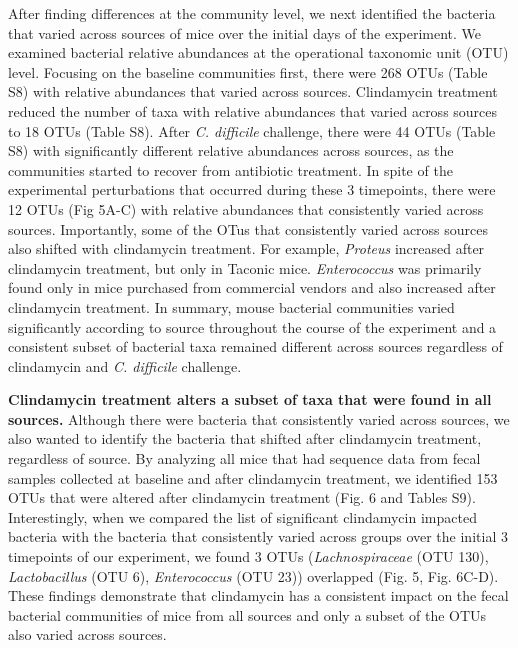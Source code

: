 \documentclass[11pt,]{article}
\begin{document}
After finding differences at the community level, we next identified the
bacteria that varied across sources of mice over the initial days of the
experiment. We examined bacterial relative abundances at the operational
taxonomic unit (OTU) level. Focusing on the baseline communities first,
there were 268 OTUs (Table S8) with relative abundances that varied
across sources. Clindamycin treatment reduced the number of taxa with
relative abundances that varied across sources to 18 OTUs (Table S8).
After \emph{C. difficile} challenge, there were 44 OTUs (Table S8) with
significantly different relative abundances across sources, as the
communities started to recover from antibiotic treatment. In spite of
the experimental perturbations that occurred during these 3 timepoints,
there were 12 OTUs (Fig 5A-C) with relative abundances that consistently
varied across sources. Importantly, some of the OTus that consistently
varied across sources also shifted with clindamycin treatment. For
example, \emph{Proteus} increased after clindamycin treatment, but only
in Taconic mice. \emph{Enterococcus} was primarily found only in mice
purchased from commercial vendors and also increased after clindamycin
treatment. In summary, mouse bacterial communities varied significantly
according to source throughout the course of the experiment and a
consistent subset of bacterial taxa remained different across sources
regardless of clindamycin and \emph{C. difficile} challenge.

\textbf{Clindamycin treatment alters a subset of taxa that were found in
all sources.} Although there were bacteria that consistently varied
across sources, we also wanted to identify the bacteria that shifted
after clindamycin treatment, regardless of source. By analyzing all mice
that had sequence data from fecal samples collected at baseline and
after clindamycin treatment, we identified 153 OTUs that were altered
after clindamycin treatment (Fig. 6 and Tables S9). Interestingly, when
we compared the list of significant clindamycin impacted bacteria with
the bacteria that consistently varied across groups over the initial 3
timepoints of our experiment, we found 3 OTUs (\emph{Lachnospiraceae}
(OTU 130), \emph{Lactobacillus} (OTU 6), \emph{Enterococcus} (OTU 23))
overlapped (Fig. 5, Fig. 6C-D). These findings demonstrate that
clindamycin has a consistent impact on the fecal bacterial communities
of mice from all sources and only a subset of the OTUs also varied
across sources.
\end{document}
